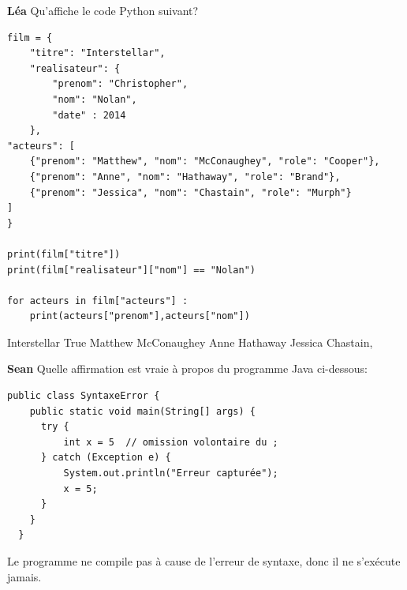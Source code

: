 \begin{Exercice}[5 minutes]\textbf{Léa}
Qu'affiche le code Python suivant?

\begin{lstlisting}[style=pythonstyle]
film = {
    "titre": "Interstellar",
    "realisateur": {
        "prenom": "Christopher",
        "nom": "Nolan",
        "date" : 2014
    },
"acteurs": [
    {"prenom": "Matthew", "nom": "McConaughey", "role": "Cooper"},
    {"prenom": "Anne", "nom": "Hathaway", "role": "Brand"},
    {"prenom": "Jessica", "nom": "Chastain", "role": "Murph"}
]
}

print(film["titre"])
print(film["realisateur"]["nom"] == "Nolan")

for acteurs in film["acteurs"] :
    print(acteurs["prenom"],acteurs["nom"])
\end{lstlisting}


\begin{solution}
Interstellar True Matthew McConaughey Anne Hathaway Jessica Chastain,
\end{solution}
\end{Exercice}

\begin{Exercice}[5 minutes]\textbf{Sean}
Quelle affirmation est vraie à propos du programme Java ci-dessous:
\begin{lstlisting}[style=javastyle]
public class SyntaxeError {
    public static void main(String[] args) {
      try {
          int x = 5  // omission volontaire du ;  
      } catch (Exception e) {
          System.out.println("Erreur capturée");
          x = 5;
      }
    }
  }
\end{lstlisting}

\begin{solution}
Le programme ne compile pas à cause de l'erreur de syntaxe, donc il ne s'exécute jamais.
\end{solution}
\end{Exercice}


